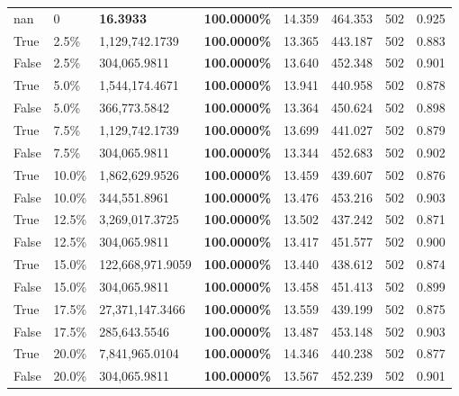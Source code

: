 \begin{table}[H]
{\begin{tabular}{lllrllll}
\midrule
nan & 0 & \bfseries 16.3933 & \bfseries 100.0000\% & 14.359 & 464.353 & 502 & 0.925 \\
\cline{1-8}
True & 2.5\% & 1,129,742.1739 & \bfseries \color{red} 100.0000\% & 13.365 & 443.187 & 502 & 0.883 \\
\cline{1-8}
False & 2.5\% & 304,065.9811 & \bfseries \color{red} 100.0000\% & 13.640 & 452.348 & 502 & 0.901 \\
\cline{1-8}
True & 5.0\% & 1,544,174.4671 & \bfseries \color{red} 100.0000\% & 13.941 & 440.958 & 502 & 0.878 \\
\cline{1-8}
False & 5.0\% & 366,773.5842 & \bfseries \color{red} 100.0000\% & 13.364 & 450.624 & 502 & 0.898 \\
\cline{1-8}
True & 7.5\% & 1,129,742.1739 & \bfseries \color{red} 100.0000\% & 13.699 & 441.027 & 502 & 0.879 \\
\cline{1-8}
False & 7.5\% & 304,065.9811 & \bfseries \color{red} 100.0000\% & 13.344 & 452.683 & 502 & 0.902 \\
\cline{1-8}
True & 10.0\% & 1,862,629.9526 & \bfseries \color{red} 100.0000\% & 13.459 & 439.607 & 502 & 0.876 \\
\cline{1-8}
False & 10.0\% & 344,551.8961 & \bfseries \color{red} 100.0000\% & 13.476 & 453.216 & 502 & 0.903 \\
\cline{1-8}
True & 12.5\% & 3,269,017.3725 & \bfseries \color{red} 100.0000\% & 13.502 & 437.242 & 502 & 0.871 \\
\cline{1-8}
False & 12.5\% & 304,065.9811 & \bfseries \color{red} 100.0000\% & 13.417 & 451.577 & 502 & 0.900 \\
\cline{1-8}
True & 15.0\% & 122,668,971.9059 & \bfseries \color{red} 100.0000\% & 13.440 & 438.612 & 502 & 0.874 \\
\cline{1-8}
False & 15.0\% & 304,065.9811 & \bfseries \color{red} 100.0000\% & 13.458 & 451.413 & 502 & 0.899 \\
\cline{1-8}
True & 17.5\% & 27,371,147.3466 & \bfseries \color{red} 100.0000\% & 13.559 & 439.199 & 502 & 0.875 \\
\cline{1-8}
False & 17.5\% & 285,643.5546 & \bfseries \color{red} 100.0000\% & 13.487 & 453.148 & 502 & 0.903 \\
\cline{1-8}
True & 20.0\% & 7,841,965.0104 & \bfseries \color{red} 100.0000\% & 14.346 & 440.238 & 502 & 0.877 \\
\cline{1-8}
False & 20.0\% & 304,065.9811 & \bfseries \color{red} 100.0000\% & 13.567 & 452.239 & 502 & 0.901 \\
\cline{1-8}

\end{tabular}}
\end{table}
